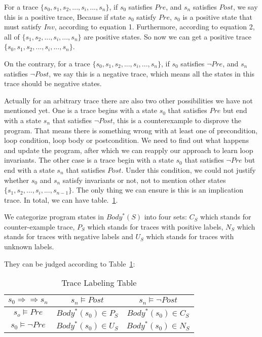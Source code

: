 For a trace $\{s_0, s_1, s_2, ..., s_i, ... , s_n\}$, 
if $s_0$ satisfies $Pre$, and $s_n$ satisfies $Post$,
we say this is a positive trace,
Because if state $s_0$ satisfy $Pre$,
$s_0$ is a positive state that must satisfy $Inv$, according to equation 1.
Furthermore, according to equation 2,
all of $\{s_1, s_2, ..., s_i, ... , s_n\}$ are positive states.
So now we can get a positive trace  $\{s_0, s_1, s_2, ..., s_i, ... , s_n\}$.


On the contrary, for a trace $\{s_0, s_1, s_2, ..., s_i, ... , s_n\}$, 
if $s_0$ satisfies $\neg Pre$, and $s_n$ satisfies $\neg Post$,
we say this is a negative trace, 
which means all the states in this trace should be negative states.  

Actually for an arbitrary trace there are also two other possibilities we have not mentioned yet.
One is a trace begins with a state $s_0$ that satisfies $Pre$ but end with a state $s_n$ that satisfies $\neg Post$,
this is a counterexample to disprove the program.
That means there is something wrong with at least one of precondition, loop condition, loop body or postcondition.
We need to find out what happens and update the program, 
after which we can reapply our approach to learn loop invariants.
The other case is a trace begin with a state $s_0$ that satisfies $\neg Pre$ but end with a state $s_n$ that satisfies $Post$.
Under this condition, we could not justify whether $s_0$ and $s_n$ satisfy invariants or not,
not to mention other states $\{s_1, s_2, ..., s_i, ... , s_{n-1}\}$.
The only thing we can ensure is this is an implication trace.
In total, we can have table.~\ref{LabelingTable}.


We categorize program states in $Body^*(S)$ into four sets:
$C_{S}$ which stands for counter-example trace, 
$P_{S}$ which stands for traces with positive labels, 
$N_{S}$ which stands for traces with negative labels 
and $U_{S}$ which stands for traces with unknown labels.

They can be judged according to Table~\ref{LabelingTable}: 
\begin{table}[htb]
\label{LabelingTable}
\centering
\caption{Trace Labeling Table}
\begin{tabular}[float]{|c|c|c|}
\hline
$s_0 \Rightarrow \Rightarrow s_n$ & $s_n \models Post$            & $s_n \models \neg Post$\\
\hline
$s_o \models Pre$                 & $Body^*(s_0) \in P_{S}$       & $Body^*(s_0) \in C_{S}$\\
\hline
$s_0 \models \neg Pre$            & $Body^*(s_0) \in U_{S}$       & $Body^*(s_0) \in N_{S}$\\
\hline
\end{tabular}
\end{table}



